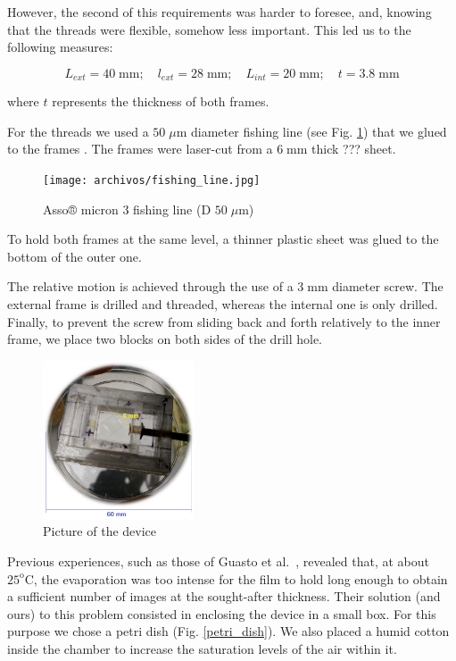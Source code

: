 However, the second of this requirements was harder to foresee, and, knowing that the threads were flexible, somehow less important. This led us to the following measures:

\begin{equation}
	L_{ext} = 40 \; \textrm{mm}; \quad l_{ext} = 28 \; \textrm{mm}; \quad L_{int} = 20 \; \textrm{mm}; \quad t = 3.8 \; \textrm{mm}
\end{equation}

where $t$ represents the thickness of both frames.

For the threads we used a $50 \; \mu \textrm{m}$ diameter fishing line (see Fig. \ref{fishing_line}) that we glued to the frames . The frames were laser-cut from a $6 \; \textrm{mm}$ thick ??? sheet.

\begin{figure}[H]
	\centering
	\texttt{[image: archivos/fishing\_line.jpg]}
	\caption{Asso® micron 3 fishing line (D $50 \; \mu \textrm{m}$)}
	\label{fishing_line}
\end{figure}

To hold both frames at the same level, a thinner plastic sheet was glued to the bottom of the outer one.

The relative motion is achieved through the use of a $3 \; \textrm{mm}$ diameter screw. The external frame is drilled and threaded, whereas the internal one is only drilled. Finally, to prevent the screw from sliding back and forth relatively to the inner frame, we place two blocks on both sides of the drill hole.   

\begin{figure}[H]
	\centering
	\includegraphics[width=0.4\textwidth]{archivos/device.png}
	\caption{Picture of the device}
	\label{device}
\end{figure}

Previous experiences, such as those of Guasto et al.~\cite{Guasto}, revealed that, at about $25^\textrm{o}\textrm{C}$, the evaporation was too intense for the film to hold long enough to obtain a sufficient number of images at the sought-after thickness. Their solution (and ours) to this problem consisted in enclosing the device in a small box. For this purpose we chose a petri dish (Fig. \ref{petri_dish}). We also placed a humid cotton inside the chamber to increase the saturation levels of the air within it.

